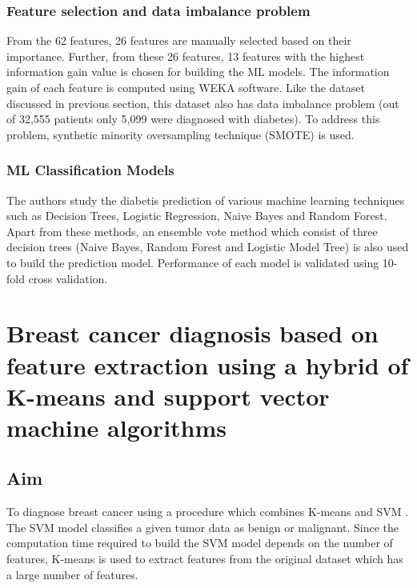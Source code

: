 \documentclass[twoside]{iitbreport}
\begin{document}
\subsubsection{Feature selection and data imbalance problem}
From the 62 features, 26 features are manually selected based on their importance. Further, from these 26 features, 13 features with the highest information gain value is chosen for building the ML models. The information gain of each feature is computed using WEKA software. Like the dataset discussed in previous section, this dataset also has data imbalance problem (out of 32,555 patients only 5,099 were diagnosed with diabetes). To address this problem, synthetic minority oversampling technique (SMOTE) is used. 

\subsubsection{ML Classification Models}
The authors study the diabetis prediction of various machine learning techniques such as Decision Trees, Logistic Regression, Naive Bayes and  Random Forest. Apart from these methods, an ensemble vote method which consist of three decision trees (Naive Bayes, Random Forest and Logistic Model Tree) is also used to build the prediction model. Performance of each model is validated using 10-fold cross validation. 


\section{Breast cancer diagnosis based on feature extraction using a hybrid of K-means and support vector machine algorithms}
\subsection{Aim}
To diagnose breast cancer using a procedure which combines K-means and SVM \cite{zheng2014breast}. The SVM model classifies a given tumor data as benign or malignant. Since the computation time required to build the SVM model depends on the number of features, K-means is used to extract features from the original dataset which has a large number of features. 
\end{document}
